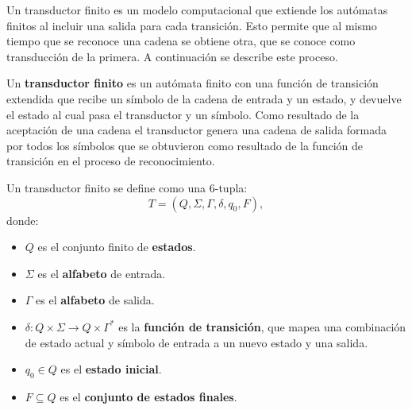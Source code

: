 Un transductor finito \cite{finite_transducer} es un modelo computacional que extiende los autómatas finitos al 
incluir una salida para cada transición. Esto permite que al mismo tiempo que se reconoce una cadena se obtiene otra, 
que se conoce como transducción de la primera. A continuación se describe este proceso.

\begin{definition}
  Un \textbf{transductor finito} es un autómata finito con una función de transición extendida que recibe un símbolo de la cadena de entrada y un estado, y devuelve el estado al cual pasa el transductor y un símbolo.  Como resultado de la aceptación de una cadena el transductor genera una cadena de salida formada por todos los símbolos que se obtuvieron como resultado de la función de transición en el proceso de reconocimiento.
  
  Un transductor finito se define como una 6-tupla:
  \[
    T = (Q, \Sigma, \Gamma, \delta, q_0, F),
  \]
  donde:
  \begin{itemize}
    \item \(Q\) es el conjunto finito de \textbf{estados}.
    \item \(\Sigma\) es el \textbf{alfabeto} de entrada.
    \item \(\Gamma\) es el \textbf{alfabeto} de salida.
    \item \(\delta: Q \times \Sigma \to Q \times \Gamma^*\) es la \textbf{función de transición}, que mapea una combinación de estado actual y símbolo de entrada a un nuevo estado y una salida.
    \item \(q_0 \in Q\) es el \textbf{estado inicial}.
    \item \(F \subseteq Q\) es el \textbf{conjunto de estados finales}.
  \end{itemize}
\end{definition}


